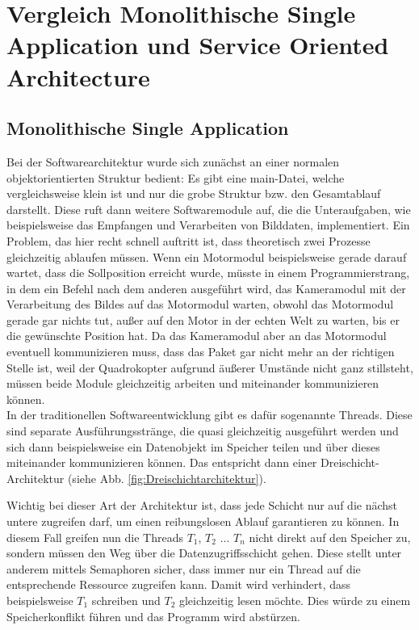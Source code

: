 \section{Vergleich Monolithische Single Application und Service Oriented Architecture}
\subsection{Monolithische Single Application}
Bei der Softwarearchitektur wurde sich zunächst an einer normalen objektorientierten Struktur bedient: Es gibt eine main-Datei, welche vergleichsweise
klein ist und nur die grobe Struktur bzw. den Gesamtablauf darstellt. Diese ruft dann weitere Softwaremodule auf, die die Unteraufgaben, wie beispielsweise das Empfangen und Verarbeiten von Bilddaten, implementiert. Ein Problem, das hier recht schnell auftritt ist, dass theoretisch zwei Prozesse gleichzeitig ablaufen müssen. Wenn ein Motormodul beispielsweise gerade darauf wartet, dass die Sollposition erreicht wurde, müsste in einem Programmierstrang, in dem ein Befehl nach dem anderen ausgeführt wird, das Kameramodul mit der Verarbeitung des Bildes auf das Motormodul warten, obwohl das Motormodul gerade gar nichts tut, außer auf den
Motor in der echten Welt zu warten, bis er die gewünschte Position hat. Da das Kameramodul aber an das Motormodul eventuell kommunizieren muss, dass das
Paket gar nicht mehr an der richtigen Stelle ist, weil der Quadrokopter aufgrund äußerer Umstände nicht ganz stillsteht, müssen beide Module gleichzeitig arbeiten und
miteinander kommunizieren können. \\

In der traditionellen Softwareentwicklung gibt es dafür sogenannte Threads. Diese sind separate Ausführungsstränge, die quasi gleichzeitig ausgeführt werden und sich dann beispielsweise ein Datenobjekt im Speicher teilen und über dieses miteinander kommunizieren können. Das entspricht dann einer Dreischicht-Architektur (siehe Abb. \ref{fig:Dreischichtarchitektur}).

Wichtig bei dieser Art der Architektur ist, dass jede Schicht nur auf die nächst untere zugreifen darf, um einen reibungslosen Ablauf garantieren zu können. In diesem Fall greifen nun die Threads $T_1$, $T_2$ ... $T_n$ nicht direkt auf den Speicher zu, sondern müssen den Weg über die Datenzugriffsschicht gehen. Diese stellt unter anderem mittels Semaphoren sicher, dass immer nur ein Thread auf die entsprechende Ressource zugreifen kann. Damit wird verhindert, dass beispielsweise $T_1$ schreiben und $T_2$ gleichzeitig lesen möchte. Dies würde zu einem Speicherkonflikt führen und das Programm wird abstürzen. \cite{riedel2019itarch}

